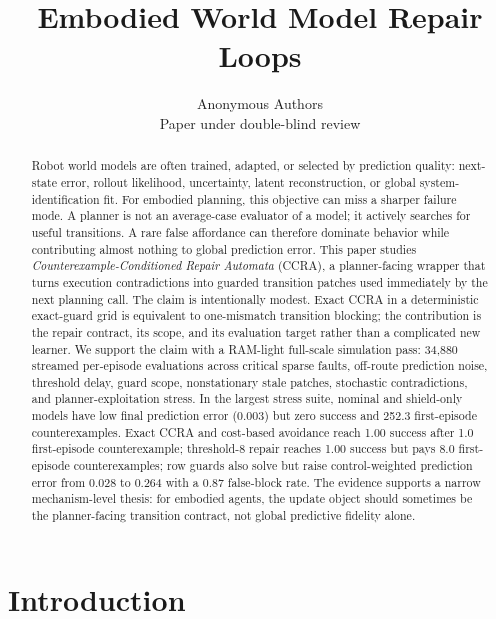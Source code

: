 \documentclass{article}
\title{Embodied World Model Repair Loops}
\author{Anonymous Authors\\
Paper under double-blind review}
\begin{document}
\maketitle

\begin{abstract}
Robot world models are often trained, adapted, or selected by prediction quality: next-state error, rollout likelihood, uncertainty, latent reconstruction, or global system-identification fit. For embodied planning, this objective can miss a sharper failure mode. A planner is not an average-case evaluator of a model; it actively searches for useful transitions. A rare false affordance can therefore dominate behavior while contributing almost nothing to global prediction error. This paper studies \emph{Counterexample-Conditioned Repair Automata} (CCRA), a planner-facing wrapper that turns execution contradictions into guarded transition patches used immediately by the next planning call. The claim is intentionally modest. Exact CCRA in a deterministic exact-guard grid is equivalent to one-mismatch transition blocking; the contribution is the repair contract, its scope, and its evaluation target rather than a complicated new learner. We support the claim with a RAM-light full-scale simulation pass: 34,880 streamed per-episode evaluations across critical sparse faults, off-route prediction noise, threshold delay, guard scope, nonstationary stale patches, stochastic contradictions, and planner-exploitation stress. In the largest stress suite, nominal and shield-only models have low final prediction error (0.003) but zero success and 252.3 first-episode counterexamples. Exact CCRA and cost-based avoidance reach 1.00 success after 1.0 first-episode counterexample; threshold-8 repair reaches 1.00 success but pays 8.0 first-episode counterexamples; row guards also solve but raise control-weighted prediction error from 0.028 to 0.264 with a 0.87 false-block rate. The evidence supports a narrow mechanism-level thesis: for embodied agents, the update object should sometimes be the planner-facing transition contract, not global predictive fidelity alone.
\end{abstract}

\section{Introduction}
\end{document}
